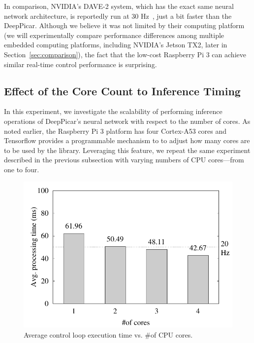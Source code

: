 In comparison, NVIDIA's DAVE-2 system, which has the exact same neural
network architecture, is reportedly run at 30 Hz~\cite{Bojarski2016},
just a bit faster than the DeepPicar. Although we believe it was not
limited by their computing platform (we will experimentally compare
performance differences among multiple embedded computing platforms,
including NVIDIA's Jetson TX2, later in
Section~\ref{sec:comparison}), the fact that the low-cost
Raspberry Pi 3 can achieve similar real-time control performance is
surprising.

\subsection{Effect of the Core Count to Inference Timing}

In this experiment, we investigate the scalability of performing
inference operations of DeepPicar's neural network with respect to the
number of cores. As noted earlier, the Raspberry Pi 3 platform has
four Cortex-A53 cores and Tensorflow 
provides a programmable mechanism to to adjust how many cores are to be
used by the library. Leveraging this feature, we repeat the
same experiment described in the previous subsection with varying
numbers of CPU cores---from one to four.


\begin{figure}[h]
  \centering
  \includegraphics[width=.45\textwidth]{figs/perf_vs_corecnt}
  \caption{Average control loop execution time vs. \#of CPU
    cores.}
  \label{fig:perf-vs-corecnt}
\end{figure}


